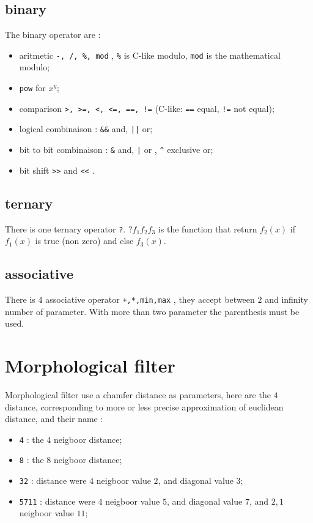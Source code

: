 \subsection{binary}
The binary operator are :

\begin{itemize}
   \item aritmetic {\tt -, /, \%, mod}  , {\tt \%} is C-like modulo, {\tt mod} is the mathematical modulo;
   \item {\tt pow} for $x^y$;
   \item comparison {\tt >, >=, <, <=, ==, !=} (C-like: {\tt ==}  equal, {\tt !=} not equal);
   \item logical combinaison : {\tt \&\&} and,   {\tt ||} or;
   \item bit to bit  combinaison : {\tt \&} and,   {\tt |} or , {\tt \^{}} exclusive or;
   \item bit shift {\tt >>} and {\tt <<} .

\end{itemize}


\subsection{ternary}

There is one ternary operator {\tt ?}. $? f_1 f_2 f_3$ is the function that
return $f_2(x)$ if $f_1(x)$ is true (non zero) and else $f_3(x)$.

\subsection{associative}

There is $4$ associative operator {\tt +,*,min,max} , they accept between $2$ and infinity number of parameter.
With more than two parameter the parenthesis must be used.


\section{Morphological filter}

Morphological filter use a chamfer distance as parameters, here are
the $4$ distance, corresponding to more or less precise approximation of
euclidean distance, and their name :

\begin{itemize}
   \item {\tt 4} : the $4$ neigboor distance;
   \item {\tt 8} : the $8$ neigboor distance;
   \item {\tt 32} : distance were $4$ neigboor value $2$, and diagonal value $3$;
   \item {\tt 5711} : distance were $4$ neigboor value $5$, and diagonal value $7$, and $2,1$ neigboor value $11$;
\end{itemize}

